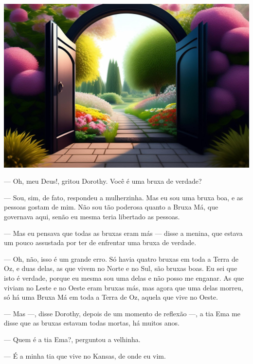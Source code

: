 \begin{myquote}
\textit{}

\begin{center}
\includegraphics[width=\textwidth]{media/image22b.jpg}
\end{center}

--- Oh, meu Deus!, gritou Dorothy. Você é uma bruxa de verdade?

--- Sou, sim, de fato, respondeu a mulherzinha. Mas eu sou uma bruxa boa, e
as pessoas gostam de mim. Não sou tão poderosa quanto a Bruxa Má, 
que governava aqui, senão eu mesma teria libertado as pessoas.

--- Mas eu pensava que todas as bruxas eram más --- disse a menina, que estava um pouco
assustada por ter de enfrentar uma bruxa de verdade. 

--- Oh, não, isso é um grande erro. Só havia quatro bruxas em toda a Terra de Oz, 
e duas delas, as que vivem no Norte e no Sul, são bruxas boas. 
Eu sei que isto é verdade, porque eu mesma sou uma delas e não posso me enganar. 
As que viviam no Leste e no Oeste eram bruxas más, mas agora que uma delas morreu, 
só há uma Bruxa Má em toda a Terra de Oz, aquela que vive no Oeste.

--- Mas ---, disse Dorothy, depois de um momento de reflexão ---, a tia Ema me disse
que as bruxas estavam todas mortas, há muitos anos.

--- Quem é a tia Ema?, perguntou a velhinha.

--- É a minha tia que vive no Kansas, de onde eu vim.

\end{myquote}

